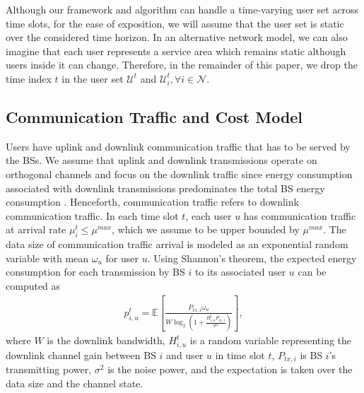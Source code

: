 \documentclass[12pt, draftclsnofoot, letterpaper, onecolumn]{IEEEtran}
\begin{document}
Although our framework and algorithm can handle a time-varying user set across time slots, for the ease of exposition, we will assume that the user set is static over the considered time horizon. In an alternative network model, we can also imagine that each user represents a service area which remains static although users inside it can change. Therefore, in the remainder of this paper, we drop the time index $t$ in the user set $\mathcal{U}^t$ and $\mathcal{U}^t_i, \forall i\in \mathcal{N}$.

\subsection{Communication Traffic and Cost Model}
Users have uplink and downlink communication traffic that has to be served by the BSs. We assume that uplink and downlink transmissions operate on orthogonal channels and focus on the downlink traffic since energy consumption associated with downlink transmissions predominates the total BS energy consumption \cite{Auer2011}. Henceforth, communication traffic refers to downlink communication traffic. In each time slot $t$, each user $u$ has communication traffic at arrival rate $\mu^t_i \leq \mu^{max}$, which we assume to be upper bounded by $\mu^{max}$. The data size of communication traffic arrival is modeled as an exponential random variable with mean $\omega_u$ for user $u$. Using Shannon's theorem, the expected energy consumption for each transmission by BS $i$ to its associated user $u$ can be computed as
\begin{align}
p^t_{i,u} = \mathbb{E}\left[\frac{P_{tx, i}\omega_u}{W\log_2\left(1 + \frac{H^t_{i,u}P_{tx,i}}{\sigma^2}\right)}\right],
\end{align}
where $W$ is the downlink bandwidth, $H^t_{i,u}$ is a random variable representing the downlink channel gain between BS $i$ and user $u$ in time slot $t$, $P_{tx,i}$ is BS $i$'s transmitting power, $\sigma^2$ is the noise power, and the expectation is taken over the data size and the channel state.
\end{document}

